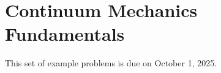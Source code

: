 
\section{Continuum Mechanics Fundamentals}
\label{PS2}

This set of example problems is due on October 1, 2025. 

